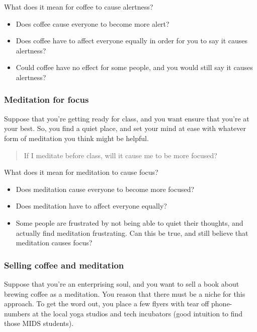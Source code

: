 \documentclass[
]{article}
\providecommand{\tightlist}{%
  \setlength{\itemsep}{0pt}\setlength{\parskip}{0pt}}
\theoremstyle{definition}
\theoremstyle{definition}
\theoremstyle{definition}
\theoremstyle{definition}
\theoremstyle{remark}
\begin{document}
What does it mean for coffee to cause alertness?

\begin{itemize}
\tightlist
\item
  Does coffee cause everyone to become more alert?
\item
  Does coffee have to affect everyone equally in order for you to say it causes alertness?
\item
  Could coffee have no effect for some people, and you would still say it causes alertness?
\end{itemize}

\subsubsection{Meditation for focus}\label{meditation-for-focus}

Suppose that you're getting ready for class, and you want ensure that you're at your best. So, you find a quiet place, and set your mind at ease with whatever form of meditation you think might be helpful.

\begin{quote}
If I meditate before class, will it cause me to be more focused?
\end{quote}

What does it mean for meditation to cause focus?

\begin{itemize}
\tightlist
\item
  Does meditation cause everyone to become more focused?
\item
  Does meditation have to affect everyone equally?
\item
  Some people are frustrated by not being able to quiet their thoughts, and actually find meditation frustrating. Can this be true, and still believe that meditation causes focus?
\end{itemize}

\subsubsection{Selling coffee and meditation}\label{selling-coffee-and-meditation}

Suppose that you're an enterprising soul, and you want to sell a book about brewing coffee as a meditation. You reason that there must be a niche for this approach. To get the word out, you place a few flyers with tear off phone-numbers at the local yoga studios and tech incubators (good intuition to find those MIDS students).
\end{document}
